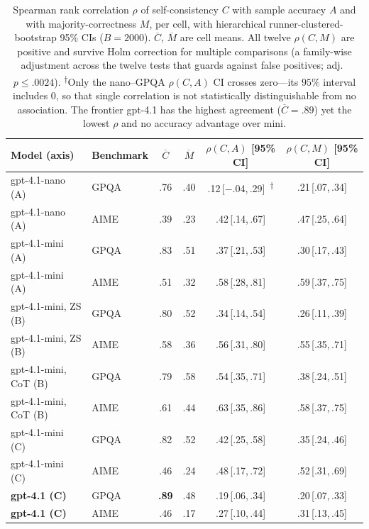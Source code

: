 \documentclass[11pt]{article}
\newcommand{\C}{\textit{C}}
\newcommand{\A}{\textit{A}}
\newcommand{\Mlab}{\textit{M}}
\begin{document}
\begin{table}[t]
\centering\small
\setlength{\tabcolsep}{6pt}
\begin{tabular}{@{}llcccc@{}}
\toprule
Model (axis) & Benchmark & $\overline{\C}$ & $\overline{\Mlab}$ & $\rho(\C,\A)$ [95\% CI] & $\rho(\C,\Mlab)$ [95\% CI] \\
\midrule
gpt-4.1-nano (A)        & GPQA & .76 & .40 & .12\,[$-$.04,\,.29]\ \textsuperscript{$\dagger$} & .21\,[.07,\,.34] \\
gpt-4.1-nano (A)        & AIME & .39 & .23 & .42\,[.14,\,.67] & .47\,[.25,\,.64] \\
gpt-4.1-mini (A)        & GPQA & .83 & .51 & .37\,[.21,\,.53] & .30\,[.17,\,.43] \\
gpt-4.1-mini (A)        & AIME & .51 & .32 & .58\,[.28,\,.81] & .59\,[.37,\,.75] \\
gpt-4.1-mini, ZS (B)    & GPQA & .80 & .52 & .34\,[.14,\,.54] & .26\,[.11,\,.39] \\
gpt-4.1-mini, ZS (B)    & AIME & .58 & .36 & .56\,[.31,\,.80] & .55\,[.35,\,.71] \\
gpt-4.1-mini, CoT (B)   & GPQA & .79 & .58 & .54\,[.35,\,.71] & .38\,[.24,\,.51] \\
gpt-4.1-mini, CoT (B)   & AIME & .61 & .44 & .63\,[.35,\,.86] & .58\,[.37,\,.75] \\
gpt-4.1-mini (C)        & GPQA & .82 & .52 & .42\,[.25,\,.58] & .35\,[.24,\,.46] \\
gpt-4.1-mini (C)        & AIME & .46 & .24 & .48\,[.17,\,.72] & .52\,[.31,\,.69] \\
\textbf{gpt-4.1 (C)}    & GPQA & \textbf{.89} & .48 & .19\,[.06,\,.34] & .20\,[.07,\,.33] \\
\textbf{gpt-4.1 (C)}    & AIME & .46 & .17 & .27\,[.10,\,.44] & .31\,[.13,\,.45] \\
\bottomrule
\end{tabular}
\caption{Spearman rank correlation $\rho$ of self-consistency $\C$ with sample accuracy $\A$ and with
majority-correctness $\Mlab$, per cell, with hierarchical runner-clustered-bootstrap 95\% CIs
($B{=}2000$). $\overline{\C}$, $\overline{\Mlab}$ are cell means. All twelve $\rho(\C,\Mlab)$ are
positive and survive Holm correction for multiple comparisons (a family-wise adjustment across the twelve tests that guards against false positives; adj.\ $p\leq.0024$). \textsuperscript{$\dagger$}Only the
nano--GPQA $\rho(\C,\A)$ CI crosses zero---its $95\%$ interval includes $0$, so that single correlation is not statistically distinguishable from no association. The frontier gpt-4.1 has the highest agreement
($\overline{\C}{=}.89$) yet the lowest $\rho$ and no accuracy advantage over mini.}
\label{tab:rho}
\end{table}
\end{document}
